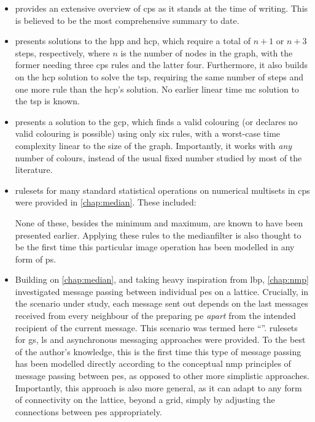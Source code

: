\begin{itemize}
    \item {} provides an extensive overview of \gls{cps} as it stands at the time of writing.  This is believed to be the most comprehensive summary to date.
    \item {} presents solutions to the \gls{hpp} and \gls{hcp}, which require a total of \(n + 1\) or \(n + 3\) steps, respectively, where \(n\) is the number of nodes in the graph, with the former needing three \gls{cps} rules and the latter four.  Furthermore, it also builds on the \gls{hcp} solution to solve the \gls{tsp}, requiring the same number of steps and one more rule than the \gls{hcp}'s solution.  No earlier linear time \gls{mc} solution to the \gls{tsp} is known.
    \item {} presents a solution to the \gls{gcp}, which finds a valid colouring (or declares no valid colouring is possible) using only six rules, with a worst-case time complexity linear to the size of the graph.  Importantly, it works with \emph{any} number of colours, instead of the usual fixed number studied by most of the literature.
    \item \Glspl{ruleset} for many standard statistical operations on numerical multisets in \gls{cps} were provided in \cref{chap:median}.  These included:
    None of these, besides the minimum and maximum, are known to have been presented earlier.  Applying these rules to the \gls{medianfilter} is also thought to be the first time this particular image operation has been modelled in any form of \gls{ps}.
    \item Building on \cref{chap:median}, and taking heavy inspiration from \gls{lbp}, \cref{chap:nmp} investigated message passing between individual \glspl{pe} on a lattice. Crucially, in the scenario under study, each message sent out depends on the last messages received from every neighbour of the preparing \gls{pe} \emph{apart} from the intended recipient of the current message.  This scenario was termed here ``''.  \Glspl{ruleset} for \gls{gs}, \gls{ls} and asynchronous messaging approaches were provided.  To the best of the author's knowledge, this is the first time this type of message passing has been modelled directly according to the conceptual \gls{nmp} principles of message passing between \glspl{pe}, as opposed to other more simplistic approaches.  Importantly, this approach is also more general, as it can adapt to any form of connectivity on the lattice, beyond a grid, simply by adjusting the connections between \glspl{pe} appropriately.

\end{itemize}
